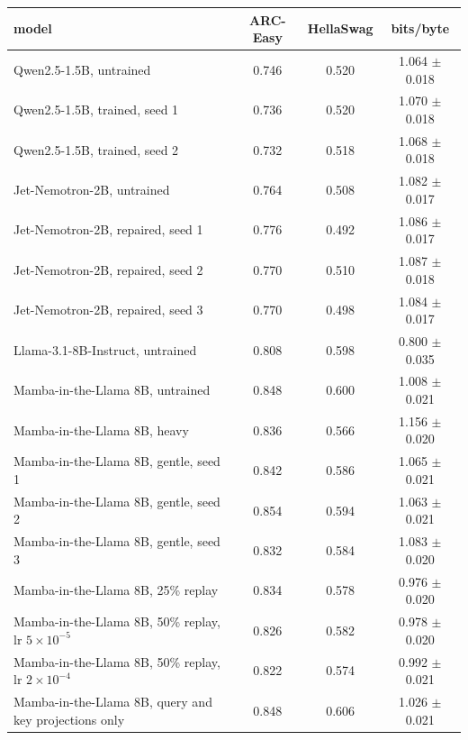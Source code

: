 \begin{tabular}{lccc}
\toprule
model & ARC-Easy & HellaSwag & bits/byte \\
\midrule
Qwen2.5-1.5B, untrained & 0.746 & 0.520 & 1.064 $\pm$ 0.018 \\
Qwen2.5-1.5B, trained, seed 1 & 0.736 & 0.520 & 1.070 $\pm$ 0.018 \\
Qwen2.5-1.5B, trained, seed 2 & 0.732 & 0.518 & 1.068 $\pm$ 0.018 \\
Jet-Nemotron-2B, untrained & 0.764 & 0.508 & 1.082 $\pm$ 0.017 \\
Jet-Nemotron-2B, repaired, seed 1 & 0.776 & 0.492 & 1.086 $\pm$ 0.017 \\
Jet-Nemotron-2B, repaired, seed 2 & 0.770 & 0.510 & 1.087 $\pm$ 0.018 \\
Jet-Nemotron-2B, repaired, seed 3 & 0.770 & 0.498 & 1.084 $\pm$ 0.017 \\
\addlinespace
Llama-3.1-8B-Instruct, untrained & 0.808 & 0.598 & 0.800 $\pm$ 0.035 \\
Mamba-in-the-Llama 8B, untrained & 0.848 & 0.600 & 1.008 $\pm$ 0.021 \\
Mamba-in-the-Llama 8B, heavy & 0.836 & 0.566 & 1.156 $\pm$ 0.020 \\
Mamba-in-the-Llama 8B, gentle, seed 1 & 0.842 & 0.586 & 1.065 $\pm$ 0.021 \\
Mamba-in-the-Llama 8B, gentle, seed 2 & 0.854 & 0.594 & 1.063 $\pm$ 0.021 \\
Mamba-in-the-Llama 8B, gentle, seed 3 & 0.832 & 0.584 & 1.083 $\pm$ 0.020 \\
Mamba-in-the-Llama 8B, 25\% replay & 0.834 & 0.578 & 0.976 $\pm$ 0.020 \\
Mamba-in-the-Llama 8B, 50\% replay, lr $5\times10^{-5}$ & 0.826 & 0.582 & 0.978 $\pm$ 0.020 \\
Mamba-in-the-Llama 8B, 50\% replay, lr $2\times10^{-4}$ & 0.822 & 0.574 & 0.992 $\pm$ 0.021 \\
Mamba-in-the-Llama 8B, query and key projections only & 0.848 & 0.606 & 1.026 $\pm$ 0.021 \\
\bottomrule
\end{tabular}
